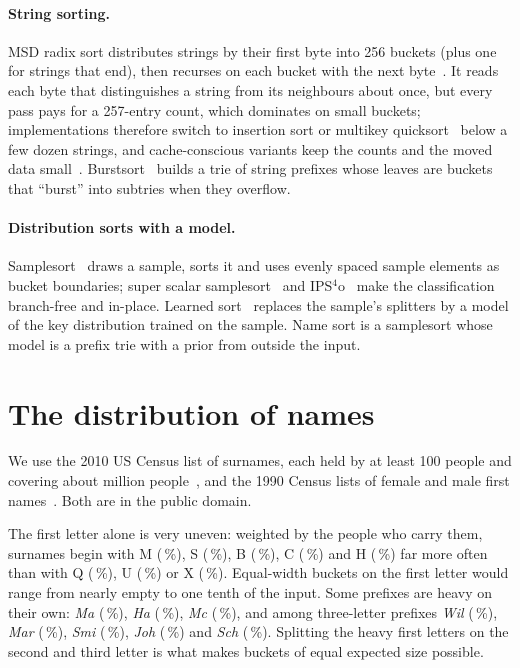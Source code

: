 \documentclass[11pt]{article}
\theoremstyle{definition}
\begin{document}
\paragraph{String sorting.} MSD radix sort distributes strings by their
first byte into 256 buckets (plus one for strings that end), then recurses
on each bucket with the next byte~\cite{mcilroy1993radix,knuth1998taocp3}.
It reads each byte that distinguishes a string from its neighbours about
once, but every pass pays for a 257-entry count, which dominates on small
buckets; implementations therefore switch to insertion sort or multikey
quicksort~\cite{bentley1997strings} below a few dozen strings, and
cache-conscious variants keep the counts and the moved data
small~\cite{karkkainen2008radix}. Burstsort~\cite{sinha2004burstsort} builds
a trie of string prefixes whose leaves are buckets that ``burst'' into
subtries when they overflow.

\paragraph{Distribution sorts with a model.} Samplesort~\cite{frazer1970samplesort}
draws a sample, sorts it and uses evenly spaced sample elements as bucket
boundaries; super scalar samplesort~\cite{sanders2004superscalar} and
IPS$^4$o~\cite{axtmann2017ips4o} make the classification branch-free and
in-place. Learned sort~\cite{kristo2020learned} replaces the sample's
splitters by a model of the key distribution trained on the sample. Name sort
is a samplesort whose model is a prefix trie with a prior from outside the
input.

\section{The distribution of names}\label{sec:data}

We use the 2010 US Census list of  surnames, each held by
at least 100 people and covering about  million
people~\cite{census2010}, and the 1990 Census lists of 
female and  male first names~\cite{census1990}. Both are in
the public domain.

The first letter alone is very uneven: weighted by the people who carry them,
surnames begin with M (\,\%), S (\,\%), B
(\,\%), C (\,\%) and H (\,\%) far more
often than with Q (\,\%), U (\,\%) or X
(\,\%). Equal-width buckets on the first letter would range from
nearly empty to one tenth of the input. Some prefixes are heavy on their own:
\emph{Ma} (\,\%), \emph{Ha} (\,\%), \emph{Mc}
(\,\%), and among three-letter prefixes \emph{Wil}
(\,\%), \emph{Mar} (\,\%), \emph{Smi}
(\,\%), \emph{Joh} (\,\%) and \emph{Sch}
(\,\%). Splitting the heavy first letters on the second and
third letter is what makes buckets of equal expected size possible.
\end{document}
